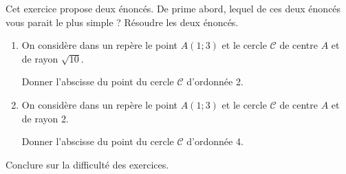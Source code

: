  
Cet exercice propose deux énoncés. De prime abord, lequel de ces deux énoncés vous parait le plus simple ?
Résoudre les deux énoncés.
\begin{enumerate}[leftmargin=*]
\item On considère dans un repère \Oij le point $A(1;3)$ et le cercle $\mathscr{C}$ de centre $A$ et de rayon $\sqrt{10}$.

Donner l'abscisse du point du cercle $\mathscr{C}$ d'ordonnée 2.
 
\item On considère dans un repère \Oij le point $A(1;3)$ et le cercle $\mathscr{C}$ de centre $A$ et de rayon 2.

Donner l'abscisse du point du cercle $\mathscr{C}$ d'ordonnée 4. 
\end{enumerate}
Conclure sur la difficulté des exercices.
